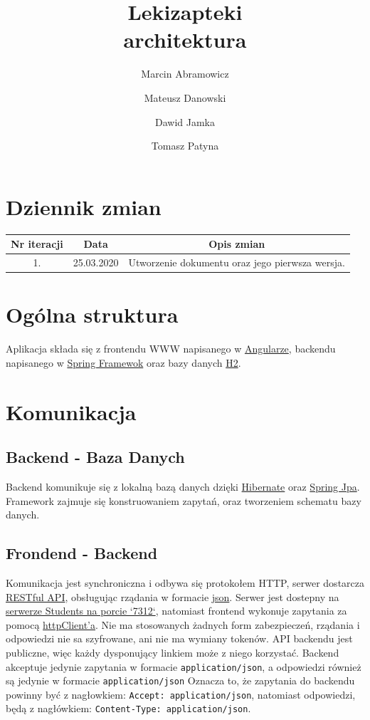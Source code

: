 \documentclass{article}
\title{
Lekizapteki\\
\large architektura}
\author{Marcin Abramowicz \and Mateusz Danowski \and Dawid Jamka \and Tomasz Patyna}
\begin{document}
  \maketitle

  \section{Dziennik zmian}
    \begin{tabular}{|c|c|c|}
      Nr iteracji & Data & Opis zmian \\
      \hline
      1. & 25.03.2020 & Utworzenie dokumentu oraz jego pierwsza wersja. \\
    \end{tabular}

  \section{Ogólna struktura}
    Aplikacja składa się z frontendu WWW napisanego w
    \href{https://angular.io}{Angularze}, backendu napisanego w
    \href{https://spring.io}{Spring Framewok} oraz bazy danych
    \href {https://www.h2database.com/html/main.html}{H2}.

  \section{Komunikacja}
    \subsection{Backend - Baza Danych}
    Backend komunikuje się z lokalną bazą danych dzięki
    \href{https://hibernate.org}{Hibernate} oraz
    \href{https://spring.io/projects/spring-data-jpa} {Spring Jpa}.
    Framework zajmuje się konstruowaniem zapytań, oraz tworzeniem schematu bazy danych.

    \subsection{Frondend - Backend}
    Komunikacja jest synchroniczna i odbywa się protokołem HTTP, serwer dostarcza
    \href{https://en.wikipedia.org/wiki/Representational_state_transfer}{RESTful API},
    obsługując rządania w formacie
    \href{https://en.wikipedia.org/wiki/JSON}{json}.
    Serwer jest dostepny na
    \href{http://students.mimuw.edu.pl:7312}{serwerze Students na porcie `7312`},
    natomiast frontend wykonuje zapytania za pomocą
    \href{https://angular.io/guide/http}{httpClient'a}.
    Nie ma stosowanych żadnych form zabezpieczeń, rządania i odpowiedzi nie sa szyfrowane, ani nie ma wymiany tokenów.
    API backendu jest publiczne, więc każdy dysponujący linkiem może z niego korzystać.
    Backend akceptuje jedynie zapytania w formacie \texttt{application/json},
    a odpowiedzi również są jedynie w formacie \texttt{application/json}
    Oznacza to, że zapytania do backendu powinny być z nagłowkiem: \texttt{Accept: application/json},
    natomiast odpowiedzi, będą z nagłówkiem: \texttt{Content-Type: application/json}.
\end{document}
